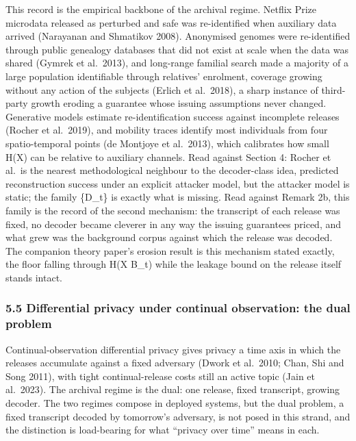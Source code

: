 \documentclass[
]{llncs}
\begin{document}
This record is the empirical backbone of the archival regime. Netflix
Prize microdata released as perturbed and safe was re-identified when
auxiliary data arrived (Narayanan and Shmatikov 2008). Anonymised
genomes were re-identified through public genealogy databases that did
not exist at scale when the data was shared (Gymrek et al.~2013), and
long-range familial search made a majority of a large population
identifiable through relatives' enrolment, coverage growing without any
action of the subjects (Erlich et al.~2018), a sharp instance of
third-party growth eroding a guarantee whose issuing assumptions never
changed. Generative models estimate re-identification success against
incomplete releases (Rocher et al.~2019), and mobility traces identify
most individuals from four spatio-temporal points (de Montjoye et
al.~2013), which calibrates how small H(X) can be relative to auxiliary
channels. Read against Section 4: Rocher et al.~is the nearest
methodological neighbour to the decoder-class idea, predicted
reconstruction success under an explicit attacker model, but the
attacker model is static; the family \{D\_t\} is exactly what is
missing. Read against Remark 2b, this family is the record of the second
mechanism: the transcript of each release was fixed, no decoder became
cleverer in any way the issuing guarantees priced, and what grew was the
background corpus against which the release was decoded. The companion
theory paper's erosion result is this mechanism stated exactly, the
floor falling through H(X \textbar{} B\_t) while the leakage bound on
the release itself stands intact.

\subsubsection{5.5 Differential privacy under continual observation: the
dual
problem}\label{differential-privacy-under-continual-observation-the-dual-problem}

Continual-observation differential privacy gives privacy a time axis in
which the releases accumulate against a fixed adversary (Dwork et
al.~2010; Chan, Shi and Song 2011), with tight continual-release costs
still an active topic (Jain et al.~2023). The archival regime is the
dual: one release, fixed transcript, growing decoder. The two regimes
compose in deployed systems, but the dual problem, a fixed transcript
decoded by tomorrow's adversary, is not posed in this strand, and the
distinction is load-bearing for what ``privacy over time'' means in
each.
\end{document}
